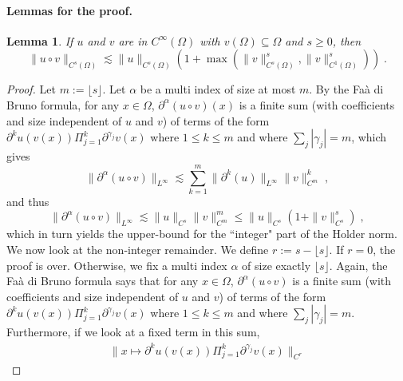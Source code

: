 \documentclass{article}
\newcommand{\1}{\mathds{1}}
\theoremstyle{plain}
\newtheorem{lemma}{Lemma}[section]
\theoremstyle{definition}
\theoremstyle{remark}
\begin{document}
\paragraph{Lemmas for the proof.}

\begin{lemma}
\label{lemma:holder_composition}
    If $u$ and $v$ are in $C^{\infty}(\Omega)$ with $v(\Omega) \subseteq \Omega$ and $s \geq 0$, then 
    \begin{equation}
        \| u \circ v\|_{C^{s}(\Omega)} \lesssim \| u \|_{C^{s}(\Omega)} (1 + \max (\| v\|_{C^{s}(\Omega)}^s, \| v\|_{C^{1}(\Omega)}^s)) \;.
    \end{equation} 
\end{lemma}
\begin{proof}
    Let $m := \lfloor s \rfloor$. Let $\alpha$ be a multi index of size at most $m$. By the Faà di Bruno formula, for any $x \in \Omega$, $\partial^{\alpha}(u \circ v)(x)$ is a finite sum (with coefficients and size independent of $u$ and $v$) of terms of the form $\partial^k u(v(x)) \Pi_{j = 1}^k \partial^{\gamma_j} v(x)$ where $1 \leq k \leq m$ and where $\sum_j | \gamma_j| = m$, which gives
    \begin{equation}
        \|\partial^{\alpha}(u \circ v) \|_{L^{\infty}} \lesssim \sum_{k = 1}^m \|\partial^{k}(u) \|_{L^{\infty}} \|v \|_{C^m}^k \;,
    \end{equation}
    and thus 
    \begin{equation}
        \|\partial^{\alpha}(u \circ v) \|_{L^{\infty}} \lesssim \|u\|_{C^s} \|v \|_{C^m}^m
        \leq \|u\|_{C^s} (1 + \|v \|_{C^{s}}^s)\;,
    \end{equation}
    which in turn yields the upper-bound for the ``integer" part of the Holder norm. We now look at the non-integer remainder.
    We define $r := s - \lfloor s \rfloor$. If $r = 0$, the proof is over. Otherwise, we fix a multi index $\alpha$ of size exactly $\lfloor s \rfloor$. Again, the Faà di Bruno formula says that for any $x \in \Omega$, $\partial^{\alpha}(u \circ v)$ is a finite sum (with coefficients and size independent of $u$ and $v$) of terms of the form $\partial^k u(v(x)) \Pi_{j = 1}^k \partial^{\gamma_j} v(x)$ where $1 \leq k \leq m$ and where $\sum_j | \gamma_j| = m$. Furthermore, if we look at a fixed term in this sum,
    \begin{equation}
    \label{eq:jhvbjhgvqsdf}
        \begin{aligned}
            \|x \mapsto \partial^k u(v(x)) \Pi_{j = 1}^k \partial^{\gamma_j} v(x)\|_{C^r}

\end{aligned}
\end{equation}
\end{proof}
\end{document}
